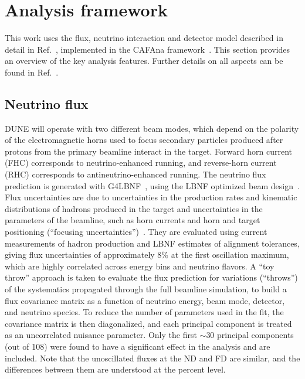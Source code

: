 \section{Analysis framework}
\label{sec:analysis_framework}
This work uses the flux, neutrino interaction and detector model described in detail in Ref.~\cite{Abi:2020qib}, implemented in the CAFAna framework~\cite{CAFAna}. This section provides an overview of the key analysis features. Further details on all aspects can be found in Ref.~\cite{Abi:2020qib}.

\subsection{Neutrino flux}
DUNE will operate with two different beam modes, which depend on the polarity of the electromagnetic horns used to focus secondary particles produced after protons from the primary beamline interact in the target. Forward horn current (FHC) corresponds to neutrino-enhanced running, and reverse-horn current (RHC) corresponds to antineutrino-enhanced running. The neutrino flux prediction is generated with G4LBNF~\cite{Aliaga:2016oaz,Abi:2020evt}, using the LBNF optimized beam design~\cite{Abi:2020evt}. Flux uncertainties are due to uncertainties in the production rates and kinematic distributions of hadrons produced in the target and uncertainties in the parameters of the beamline, such as horn currents and horn and target positioning (``focusing uncertainties'')~\cite{Abi:2020evt}. They are evaluated using current measurements of hadron production and LBNF estimates of alignment tolerances, giving flux uncertainties of approximately 8\% at the first oscillation maximum, which are highly correlated across energy bins and neutrino flavors. A ``toy throw'' approach is taken to evaluate the flux prediction for variations (``throws'') of the systematics propagated through the full beamline simulation, to build a flux covariance matrix as a function of neutrino energy, beam mode, detector, and neutrino species. To reduce the number of parameters used in the fit, the covariance matrix is then diagonalized, and each principal component is treated as an uncorrelated nuisance parameter. Only the first $\sim$30 principal components (out of 108) were found to have a significant effect in the analysis and are included. Note that the unoscillated fluxes at the ND and FD are similar, and the differences between them are understood at the percent level.

